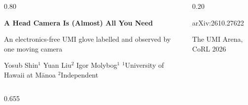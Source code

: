 \documentclass[final]{beamer}
\begin{document}
\begin{frame}[t]
\vspace*{-1.4cm}
\noindent\parbox[t][10.0cm][c]{\linewidth}{%
\begin{columns}[c,totalwidth=\linewidth]
\begin{column}{0.80\linewidth}
  \hspace*{2.4cm}\begin{minipage}{0.95\linewidth}
  {\fontsize{76}{82}\selectfont\bfseries\color{white}A Head Camera Is (Almost) All You Need\par}
  \vspace{0.5cm}
  {\fontsize{40}{46}\selectfont\color{white!85!navy}An electronics-free UMI glove labelled and observed by one moving camera\par}
  \vspace{0.8cm}
  {\fontsize{32}{36}\selectfont\color{white}Yosub Shin$^{1}$ \quad Yuan Liu$^{2}$ \quad Igor Molybog$^{1}$\hspace{2.5cm}
   {\fontsize{26}{30}\selectfont\color{white!80!navy}$^1$University of Hawai\textquotesingle i at M\=anoa \quad $^2$Independent}\par}
  \end{minipage}
\end{column}
\begin{column}{0.20\linewidth}
  \centering
  \colorbox{white}{}\par
  \par{\small\color{white!80!navy}arXiv:2610.27622\par The UMI Arena, CoRL 2026}
\end{column}
\end{columns}}
\vspace{0.5cm}

\begin{columns}[t,totalwidth=0.975\paperwidth]

\begin{column}{0.655\linewidth}


\end{column}
\end{columns}
\end{frame}
\end{document}
